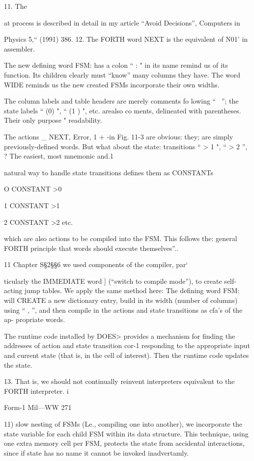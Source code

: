 11. The

at process is described in detail in my article “Avoid Decisions”, Computers in

Physics 5,“ (1991) 386.
12. The FORTH word NEXT is the equivalent of N01’ in assembler.


The new defining word FSM: has a colon “ : " in its name
remind us of its function. Its children clearly must “know”
many columns they have. The word WIDE reminds us the new
created FSMs incorporate their own widths.

The column labels and table headers are merely comments fo
lowing “ \ ”; the state labels “ (0) ", “ (1 ) ", etc. arealso co
ments, delineated with parentheses. Their only purpose "
readability.

The actions \_ NEXT, Error, 1 + -in Fig. 11-3 are obvious: they;
are simply previously-defined words. But what about the state:
transitions “ > 1 ", “ > 2 ”, ? The easiest, most mnemonic and.1

natural way to handle state transitions defines them as CONSTANTs

 

O CONSTANT >0

1 CONSTANT >1

2 CONSTANT >2
etc.

which are also actions to be compiled into the FSM. This follows the:
general FORTH principle that words should execute themselves”..

11 Chapter S§2§§6 we used components of the compiler, par‘

ticularly the IMMEDIATE word ] (“switch to compile mode”),
to create self-acting jump tables. We apply the same method here:
The defining word FSM: will CREATE a new dictionary entry,
build in its width (number of columns) using “ , ”, and then
compile in the actions and state transitions as cfa’s of the ap-
propriate words.

The runtime code installed by DOES> provides a mechanism
for finding the addresses of action and state transition cor-1
responding to the appropriate input and current state (that is, in
the cell of interest). Then the runtime code updates the state.

 

13. That is, we should not continually reinvent interpreters equivalent to the FORTH interpreter. i

Form-1 Mil—WW 271

11) slow nesting of FSMs (Le., compiling one into another), we
incorporate the state variable for each child FSM within its data
structure. This technique, using one extra memory cell per FSM,
protects the state from accidental interactions, since if state has
no name it cannot be invoked inadvertamly.

